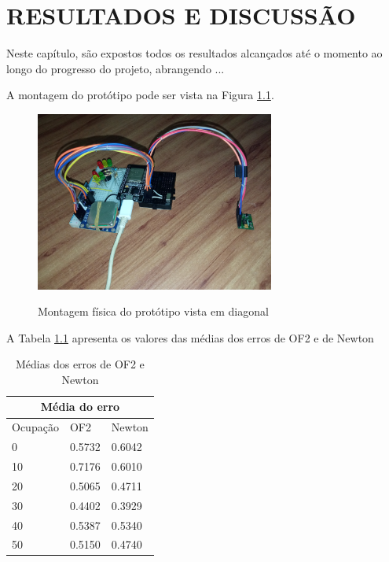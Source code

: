 \chapter{RESULTADOS E DISCUSSÃO}


Neste capítulo, são expostos todos os resultados alcançados até o momento ao longo do progresso do projeto, abrangendo ...

A montagem do protótipo pode ser vista na Figura \ref{fig:prototipo2}. 

\begin{figure}[H]
    \centering
    \captionsetup{justification=centering}
    \caption{Montagem física do protótipo vista em diagonal} 
    \includegraphics[width=0.7\textwidth]{figures/resultadosPrototipo/prototipo2.jpg}
    \label{fig:prototipo2}
\end{figure}

\setcounter{mpfootnote}{2}

A Tabela \ref{media-dos-erro-newton} apresenta os valores das médias dos erros de OF2 e de Newton\\

\begin{table}[htb]
\centering
\ABNTEXfontereduzida
\captionsetup{justification=centering}
\caption[Médias dos erros de OF2 e Newton]{Médias dos erros de OF2 e Newton}
\label{media-dos-erro-newton}
\begin{tabular}{ |p{3cm}|p{3cm}|p{3cm}|  }
\hline
\multicolumn{3}{|c|}{Média do erro} \\
\hline
Ocupação & OF2 & Newton\\
\hline
 0 & 0.5732 & 0.6042\\
 10 & 0.7176 & 0.6010\\
 20 & 0.5065 & 0.4711\\
 30 & 0.4402 & 0.3929\\
 40 & 0.5387 & 0.5340\\
 50 & 0.5150 & 0.4740\\
\hline
\end{tabular}
\end{table}
